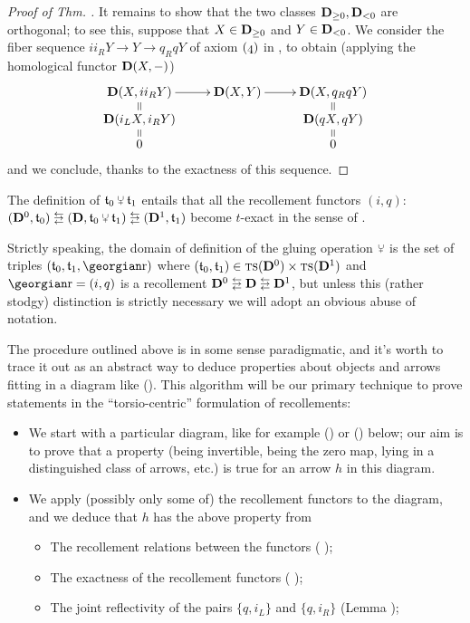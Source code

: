 \begin{proof}[Proof of Thm. \protect{\ref{gluing}}]
It remains to show that the two classes $\mathbf{D}_{\ge 0},\mathbf{D}_{<0}$ are orthogonal; to see this, suppose that $X\in \mathbf{D}_{\ge 0}$ and $Y\in \mathbf{D}_{<0}$. We consider the fiber sequence $ii_R Y\to Y\to q_R q Y$ of axiom $(\oldstylenums{4})$ in  , to obtain (applying the homological functor $\mathbf{D}(X, -)$) 
\[
\xymatrix@R=2mm{
  \D(X, ii_R Y)	& \D(X, Y)	& \D(X,q_R q Y) \\
  \D(i_LX, i_R Y)	& 	& \D(qX, qY) \\
  0	& 	& 0
  \ar@{=} "1,1";"2,1" 
  \ar "1,1";"1,2" 
  \ar "1,2";"1,3" 
  \ar@{=} "1,3";"2,3" 
  \ar@{=} "2,1";"3,1" 
  \ar@{=} "2,3";"3,3" 
}
\]and we conclude, thanks to the exactness of this sequence.
\end{proof}
\begin{remark}
The definition of $\tee_0\glue \tee_1$ entails that all the recollement functors
 $(i,q)\colon $ $(\D^0, \tee_0) \lrlarrows (\D, \tee_0\glue \tee_1) \lrlarrows (\D^1, \tee_1)$ become $t$\hyp{}exact in the sense of \cite[ \textbf{1.3.3.1}]{LurieHA}. 
\end{remark}\begin{remark}
Strictly speaking, the domain of definition of the gluing operation $\glue$ is the set of triples $(\tee_0, \tee_1, \rec)$ where $(\mathfrak{t}_0,\mathfrak{t}_1)\in \text{\scshape ts} (\mathbf{D}^0)\times \text{\scshape ts} (\mathbf{D}^1)$ and $\rec=(i,q)$ is a recollement $\D^0\lrlarrows \D \lrlarrows \D^1$, but unless this (rather stodgy) distinction is strictly necessary we will adopt an obvious abuse of notation.
\end{remark}
\begin{remark}\label{generalproced}
The procedure outlined above is in some sense paradigmatic, and it's worth to trace it out as an abstract way to deduce properties about objects and arrows fitting in a diagram like (). This algorithm will be our primary technique to prove statements in the ``torsio\hyp{}centric'' formulation of recollements:
\begin{itemize}
\item We start with a particular diagram, like for example () or () below; our aim is to prove that a property (being invertible, being the zero map, lying in a distinguished class of arrows, etc.\@\xspace) is true for an arrow $h$ in this diagram.
\item We apply (possibly only some of) the recollement functors to the diagram, and we deduce that $h$ has the above property from
\begin{itemize}
\item The recollement relations between the functors ( );
\item The exactness of the recollement functors ( );
\item The joint reflectivity of the pairs $\{q, i_L\}$ and $\{q, i_R\}$ (Lemma );
\end{itemize}
\end{itemize}
\end{remark}



